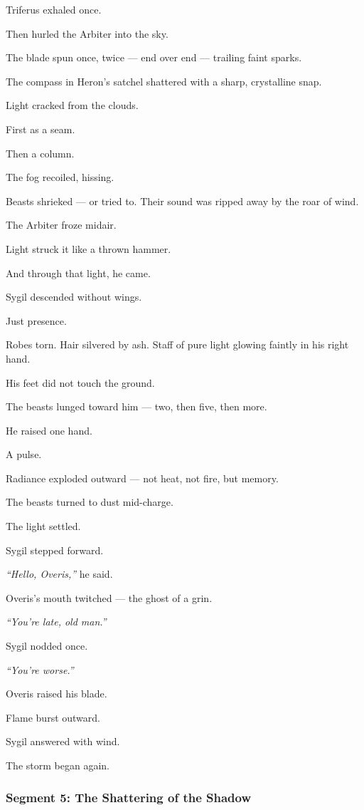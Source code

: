 \documentclass[9pt]{article}
\begin{document}
\bigskip

Triferus exhaled once.

Then hurled the Arbiter into the sky.

The blade spun once, twice — end over end — trailing faint sparks.

The compass in Heron’s satchel shattered with a sharp, crystalline snap.

Light cracked from the clouds.

First as a seam.

Then a column.

The fog recoiled, hissing.

Beasts shrieked — or tried to. Their sound was ripped away by the roar of wind.

The Arbiter froze midair.

Light struck it like a thrown hammer.

And through that light, he came.

\bigskip

Sygil descended without wings.

Just presence.

Robes torn. Hair silvered by ash. Staff of pure light glowing faintly in his right hand.

His feet did not touch the ground.

The beasts lunged toward him — two, then five, then more.

He raised one hand.

A pulse.

Radiance exploded outward — not heat, not fire, but memory.

The beasts turned to dust mid-charge.

The light settled.

Sygil stepped forward.

\textit{“Hello, Overis,”} he said.

Overis’s mouth twitched — the ghost of a grin.

\textit{“You’re late, old man.”}

Sygil nodded once.

\textit{“You’re worse.”}

Overis raised his blade.

Flame burst outward.

Sygil answered with wind.

The storm began again.

\newpage

\subsubsection*{Segment 5: The Shattering of the Shadow}
\end{document}
